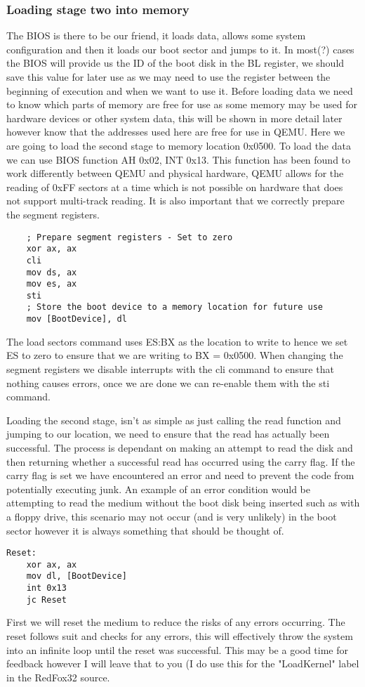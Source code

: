 \documentclass[10pt,a4paper]{article}
\begin{document}
\subsubsection{Loading stage two into memory}
The BIOS is there to be our friend, it loads data, allows some system configuration and then it loads our boot sector and jumps to it. In most(?) cases the BIOS will provide us the ID of the boot disk in the BL register, we should save this value for later use as we may need to use the register between the beginning of execution and when we want to use it. Before loading data we need to know which parts of memory are free for use as some memory may be used for hardware devices or other system data, this will be shown in more detail later however know that the addresses used here are free for use in QEMU.
\medskip
Here we are going to load the second stage to memory location 0x0500. To load the data we can use BIOS function AH 0x02, INT 0x13. This function has been found to work differently between QEMU and physical hardware, QEMU allows for the reading of 0xFF sectors at a time which is not possible on hardware that does not support multi-track reading. It is also important that we correctly prepare the segment registers.
\begin{verbatim}
    ; Prepare segment registers - Set to zero	
    xor ax, ax
    cli
    mov ds, ax
    mov es, ax
    sti
    ; Store the boot device to a memory location for future use
    mov [BootDevice], dl
\end{verbatim}
The load sectors command uses ES:BX as the location to write to hence we set ES to zero to ensure that we are writing to BX = 0x0500. When changing the segment registers we disable interrupts with the cli command to ensure that nothing causes errors, once we are done we can re-enable them with the sti command.

Loading the second stage, isn't as simple as just calling the read function and jumping to our location, we need to ensure that the read has actually been successful. The process is dependant on making an attempt to read the disk and then returning whether a successful read has occurred using the carry flag. If the carry flag is set we have encountered an error and need to prevent the code from potentially executing junk. An example of an error condition would be attempting to read the medium without the boot disk being inserted such as with a floppy drive, this scenario may not occur (and is very unlikely) in the boot sector however it is always something that should be thought of.
\begin{verbatim}
Reset:
    xor ax, ax
    mov dl, [BootDevice]
    int 0x13
    jc Reset
\end{verbatim}
First we will reset the medium to reduce the risks of any errors occurring. The reset follows suit and checks for any errors, this will effectively throw the system into an infinite loop until the reset was successful. This may be a good time for feedback however I will leave that to you (I do use this for the "LoadKernel" label in the RedFox32 source.
\end{document}
